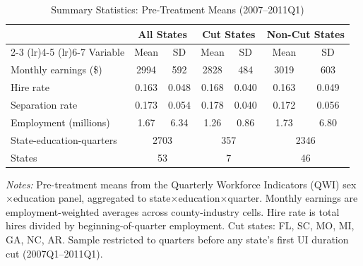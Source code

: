 
\begin{table}[H]
\centering
\caption{Summary Statistics: Pre-Treatment Means (2007--2011Q1)}
\label{tab:summary}
\begin{threeparttable}
\begin{tabular}{lcccccc}
\toprule
& \multicolumn{2}{c}{All States} & \multicolumn{2}{c}{Cut States} & \multicolumn{2}{c}{Non-Cut States} \\
\cmidrule(lr){2-3} \cmidrule(lr){4-5} \cmidrule(lr){6-7}
Variable & Mean & SD & Mean & SD & Mean & SD \\
\midrule
Monthly earnings (\$) & 2994 & 592 & 2828 & 484 & 3019 & 603 \\
Hire rate & 0.163 & 0.048 & 0.168 & 0.040 & 0.163 & 0.049 \\
Separation rate & 0.173 & 0.054 & 0.178 & 0.040 & 0.172 & 0.056 \\
Employment (millions) & 1.67 & 6.34 & 1.26 & 0.86 & 1.73 & 6.80 \\
\midrule
State-education-quarters & \multicolumn{2}{c}{2703} & \multicolumn{2}{c}{357} & \multicolumn{2}{c}{2346} \\
States & \multicolumn{2}{c}{53} & \multicolumn{2}{c}{7} & \multicolumn{2}{c}{46} \\
\bottomrule
\end{tabular}
\begin{tablenotes}[flushleft]
\small
\item \textit{Notes:} Pre-treatment means from the Quarterly Workforce Indicators (QWI) sex$\times$education panel, aggregated to state$\times$education$\times$quarter. Monthly earnings are employment-weighted averages across county-industry cells. Hire rate is total hires divided by beginning-of-quarter employment. Cut states: FL, SC, MO, MI, GA, NC, AR. Sample restricted to quarters before any state's first UI duration cut (2007Q1--2011Q1).
\end{tablenotes}
\end{threeparttable}
\end{table}
